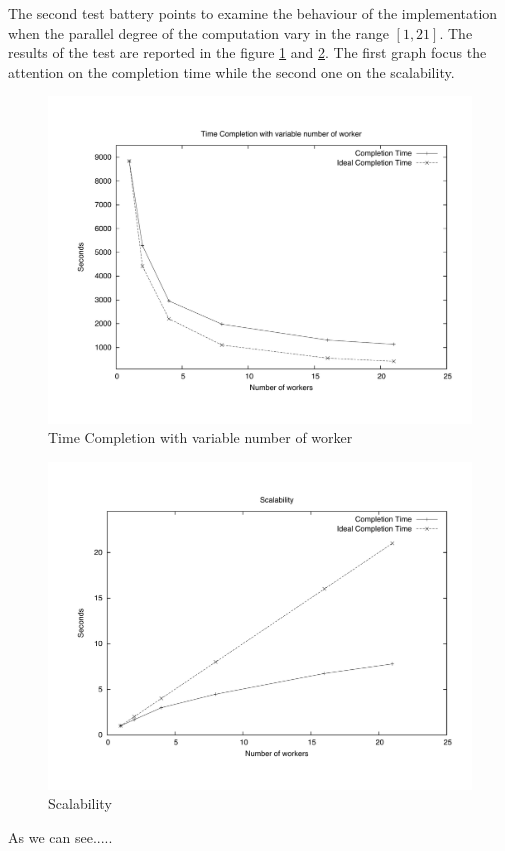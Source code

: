 The second test battery points to examine the behaviour of the implementation when the parallel degree of the computation vary in the range $[1, 21]$. The results of the test are reported in the figure \ref{NTime}  and \ref{NScal}. The first graph focus the attention on the completion time while the second one on the scalability.


\begin{figure}[th]
	\centerline{
		\mbox{\includegraphics[scale=0.48]{HadoopTest/PsFiles/NTime.pdf}}
	}
	\caption{Time Completion with variable number of worker} 
        \label{NTime}
\end{figure}

\begin{figure}[th]
	\centerline{
		\mbox{\includegraphics[scale=0.48]{HadoopTest/PsFiles/NScal.pdf}}
	}
	\caption{Scalability} 
        \label{NScal}
\end{figure}

As we can see.....